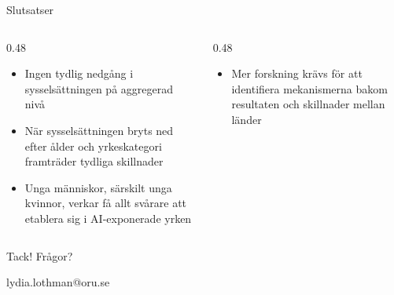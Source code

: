 \documentclass[aspectratio=169,11pt]{beamer}
\begin{document}
\begin{frame}{Slutsatser}
\begin{columns}[T]

\begin{column}{0.48\textwidth}
\begin{itemize}
    \item Ingen tydlig nedgång i sysselsättningen på aggregerad nivå
    
    \item När sysselsättningen bryts ned efter ålder och yrkeskategori framträder tydliga skillnader
    
    \item Unga människor, särskilt unga kvinnor, verkar få allt svårare att etablera sig i AI-exponerade yrken
\end{itemize}
\end{column}

\begin{column}{0.48\textwidth}
\begin{itemize}
    
    \item Mer forskning krävs för att identifiera mekanismerna bakom resultaten och skillnader mellan länder
    
\end{itemize}
\end{column}

\end{columns}

\vfill

\centering
\large Tack! Frågor?

\vspace{2mm}

\normalsize lydia.lothman@oru.se

\end{frame}
\end{document}
